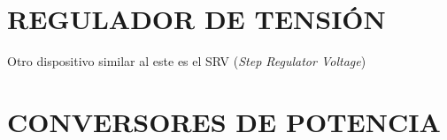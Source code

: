 \documentclass[12pt, letterpaper]{report}
\begin{document}

\section{REGULADOR DE TENSIÓN}
Otro dispositivo similar al este es el SRV (\textit{Step Regulator Voltage})
\section{CONVERSORES DE POTENCIA}
\end{document}
